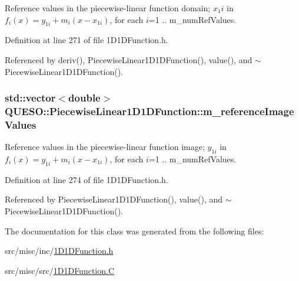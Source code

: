 Reference values in the piecewise-\/linear function domain; $ x_1i $ in $ f_i(x) = y_{1i} + m_i (x - x_{1i})$, for each $ i $=1 .. {\ttfamily m\-\_\-num\-Ref\-Values}. 



Definition at line 271 of file 1\-D1\-D\-Function.\-h.



Referenced by deriv(), Piecewise\-Linear1\-D1\-D\-Function(), value(), and $\sim$\-Piecewise\-Linear1\-D1\-D\-Function().

\hypertarget{class_q_u_e_s_o_1_1_piecewise_linear1_d1_d_function_a83a27b74cb337be9d5b3e2b91d8ab6ad}{
\subsubsection[{m\-\_\-reference\-Image\-Values}]{\setlength{\rightskip}{0pt plus 5cm}std\-::vector$<$double$>$ Q\-U\-E\-S\-O\-::\-Piecewise\-Linear1\-D1\-D\-Function\-::m\-\_\-reference\-Image\-Values\hspace{0.3cm}{\ttfamily [protected]}}}\label{class_q_u_e_s_o_1_1_piecewise_linear1_d1_d_function_a83a27b74cb337be9d5b3e2b91d8ab6ad}


Reference values in the piecewise-\/linear function image; $ y_{1i} $ in $ f_i(x) = y_{1i} + m_i (x - x_{1i})$, for each $ i $=1 .. {\ttfamily m\-\_\-num\-Ref\-Values}. 



Definition at line 274 of file 1\-D1\-D\-Function.\-h.



Referenced by Piecewise\-Linear1\-D1\-D\-Function(), value(), and $\sim$\-Piecewise\-Linear1\-D1\-D\-Function().



The documentation for this class was generated from the following files\-:\begin{DoxyCompactItemize}
\item 
src/misc/inc/\hyperlink{1_d1_d_function_8h}{1\-D1\-D\-Function.\-h}\item 
src/misc/src/\hyperlink{1_d1_d_function_8_c}{1\-D1\-D\-Function.\-C}\end{DoxyCompactItemize}

